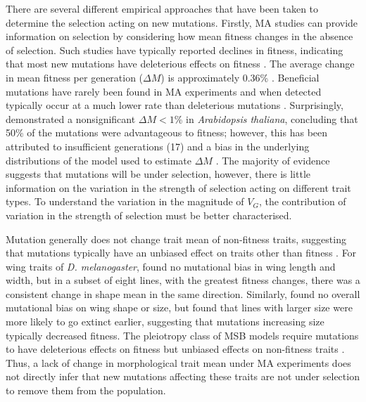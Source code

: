 There are several different empirical approaches that have been taken to determine the selection acting on new mutations. Firstly, MA studies can provide information on selection by considering how mean fitness changes in the absence of selection. Such studies have typically reported declines in fitness, indicating that most new mutations have deleterious effects on fitness \citep{Hall09}. The average change in mean fitness per generation (\( \Delta M \)) is approximately 0.36\% \citep{Hall09}. Beneficial mutations have rarely been found in MA experiments and when detected typically occur at a much lower rate than deleterious mutations \citep{Jose04}. Surprisingly, \citet{Shaw00} demonstrated a nonsignificant \( \Delta M \)$<1$\% in \textit{Arabidopsis thaliana}, concluding that 50\% of the mutations were advantageous to fitness; however, this has been attributed to insufficient generations (17) and a bias in the underlying distributions of the model used to estimate \( \Delta M \) \citep{Keig03}. The majority of evidence suggests that mutations will be under selection, however, there is little information on the variation in the strength of selection acting on different trait types. To understand the variation in the magnitude of $V_G$, the contribution of variation in the strength of selection must be better characterised. \par

Mutation generally does not change trait mean of non-fitness traits, suggesting that mutations typically have an unbiased effect on traits other than fitness \citep{John05}. For wing traits of \textit{D. melanogaster}, \citet{Sant92} found no mutational bias in wing length and width, but in a subset of eight lines, with the greatest fitness changes, there was a consistent change in shape mean in the same direction. Similarly, \citet{McGu13} found no overall mutational bias on wing shape or size, but found that lines with larger size were more likely to go extinct earlier, suggesting that mutations increasing size typically decreased fitness. The pleiotropy class of MSB models require mutations to have deleterious effects on fitness but unbiased effects on non-fitness traits \citep{Keig90, Wals18c28}. Thus, a lack of change in morphological trait mean under MA experiments does not directly infer that new mutations affecting these traits are not under selection to remove them from the population. \par
 
